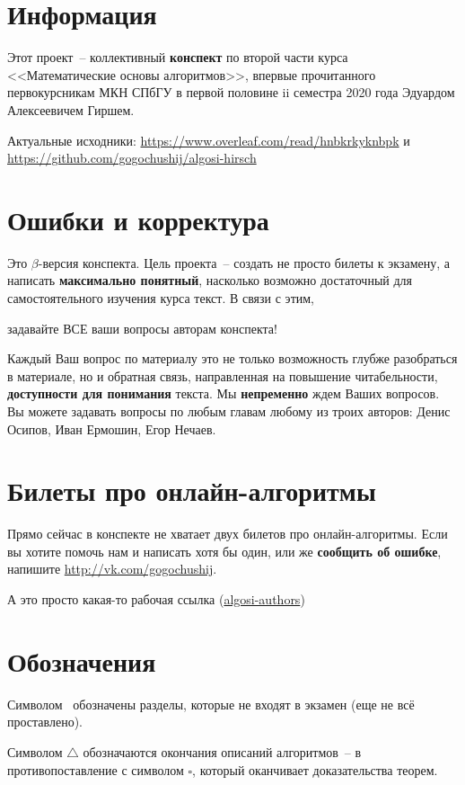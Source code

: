 \section*{Информация}

Этот проект~-- коллективный \textbf{конспект} по второй части курса <<Математические основы алгоритмов>>, впервые прочитанного первокурсникам МКН СПбГУ в первой половине ii семестра 2020 года Эдуардом Алексеевичем Гиршем.

Актуальные исходники: \url{https://www.overleaf.com/read/hnbkrkyknbpk} и \url{https://github.com/gogochushij/algosi-hirsch}

\section*{Ошибки и корректура}

Это $\beta$-версия конспекта. Цель проекта~-- создать не просто билеты к экзамену, а написать \textbf{максимально понятный}, насколько возможно достаточный для самостоятельного изучения курса текст. В связи с этим,

\begin{center} {\color{red} задавайте ВСЕ ваши вопросы авторам конспекта!}\end{center}

Каждый Ваш вопрос по материалу это не только возможность глубже разобраться в материале, но и обратная связь, направленная на повышение читабельности, \textbf{доступности для понимания} текста. Мы \textbf{непременно} ждем Ваших вопросов. Вы можете задавать вопросы по любым главам любому из троих авторов: Денис Осипов, Иван Ермошин, Егор Нечаев.

\section*{Билеты про онлайн-алгоритмы}

Прямо сейчас в конспекте не хватает двух билетов про онлайн-алгоритмы. Если вы хотите помочь нам и написать хотя бы один, или же \textbf{сообщить об ошибке}, напишите \url{http://vk.com/gogochushij}.

А это просто какая-то рабочая ссылка (\href{https://docs.google.com/spreadsheets/d/17MKhLVzCyYvEKlm6W5Bb-6uUDNyv0QLmdvuh4N6JfXI/edit?usp=sharing}{algosi-authors})

\section*{Обозначения}

Символом \heart~обозначены разделы, которые не входят в экзамен (еще не всё проставлено).

Символом $\bigtriangleup$ обозначаются окончания описаний алгоритмов~-- в противопоставление с символом $\square$, который оканчивает доказательства теорем. 
